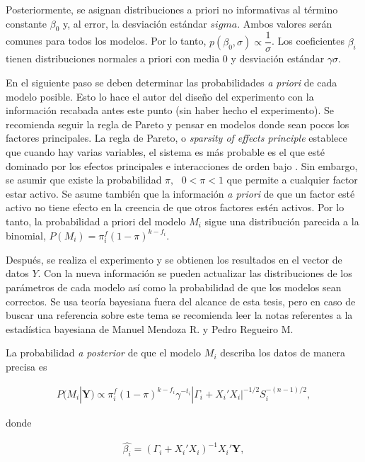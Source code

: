 Posteriormente, se asignan distribuciones a priori no informativas al término constante $\beta_0$ y, al error, la desviación estándar $sigma$. Ambos valores serán comunes para todos los modelos. Por lo tanto, $p( \beta_0, \sigma) \propto \dfrac{1}{\sigma}$. Los coeficientes $\beta_i$ tienen distribuciones normales a priori con media 0 y desviación estándar $\gamma \sigma$. 

En el siguiente paso se deben determinar las probabilidades \textit{a priori} de cada modelo posible. Esto lo hace el autor del diseño del experimento con la información recabada antes este punto (sin haber hecho el experimento). Se recomienda seguir la regla de Pareto y pensar en modelos donde sean pocos los factores principales. La regla de Pareto, o \textit{sparsity of effects principle} establece que cuando hay varias variables, el sistema es más probable es el que esté dominado por los efectos principales e interacciones de orden bajo \cite{montgomery2017design}. Sin embargo, se asumir que existe la probabilidad $\pi, \text{ } 0 < \pi < 1$ que permite a cualquier factor estar activo. Se asume también que la información \textit{a priori} de que un factor esté activo no tiene efecto en la creencia de que otros factores estén activos. Por lo tanto, la probabilidad a priori del modelo $M_i$ sigue una distribución parecida a la binomial, $P(M_i) = \pi ^f_i (1 - \pi)^{k-f_i}.$ 

Después, se realiza el experimento y se obtienen los resultados en el vector de datos \textbf{$Y$}. Con la nueva información se pueden actualizar las distribuciones de los parámetros de cada modelo así como la probabilidad de que los modelos sean correctos. Se usa teoría bayesiana fuera del alcance de esta tesis, pero en caso de buscar una referencia sobre este tema se recomienda leer la notas referentes a la estadística bayesiana de Manuel Mendoza R. y Pedro Regueiro M. 

La probabilidad \textit{a posterior} de que el modelo $M_i$ describa los datos de manera precisa es  


\begin{equation*}
	\begin{aligned}
		P(M_i | \textbf{Y}) \propto  \pi ^f_i (1 - \pi)^{k-f_i} \gamma^{-t_i} |\Gamma_i + X_i' X_i |^{-1/2} S_i^{-(n-1)/2}, 		
	\end{aligned}
\end{equation*}

\noindent donde

\begin{equation} \label{betai}
	\begin{aligned}
		\hat{\beta_i} = (\Gamma_i + X_i' X_i)^{-1} X_i ' \textbf{Y}, 
	\end{aligned}
\end{equation}

